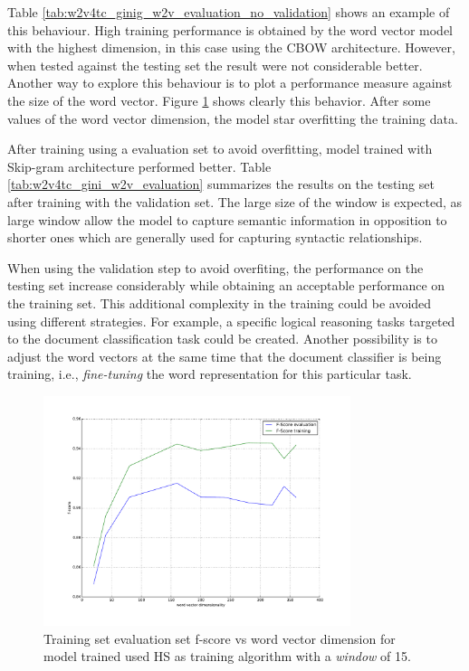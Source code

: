Table \ref{tab:w2v4tc_ginig_w2v_evaluation_no_validation} shows an example
of this behaviour. High training performance is obtained by the word vector
model with the highest dimension, in this case using the \ac{CBOW} architecture.
However, when tested against the testing set the result were not considerable
better. Another way to explore this behaviour is to plot a performance
measure against the size of the word vector. Figure
\ref{fig:fscore-vs-size-dmr} shows clearly this behavior. After some values
of the word vector dimension, the model star overfitting  the training data. 

After training using a evaluation set to avoid overfitting,  model trained
with Skip-gram architecture performed better. Table
\ref{tab:w2v4tc_gini_w2v_evaluation} summarizes the results on the testing
set after training with the validation set. The large size of the window is
expected, as large window allow the model to capture semantic information in
opposition to shorter ones which are generally used for capturing syntactic relationships.

When using the validation step to avoid overfiting, the performance on the
testing set increase considerably while obtaining an acceptable performance
on the training set. This additional complexity in the training could be
avoided using different strategies. For example, a specific logical reasoning tasks
targeted to the document classification task could be created. Another possibility is to
adjust the word vectors at the same time that the document classifier is
being training, i.e.,  \textit{fine-tuning} the word representation for this
particular task.


\begin{figure}[!h]
    \centering
    \includegraphics[width=0.80\textwidth]{images/005-fscore-vs-training-size.pdf}
    \caption{Training set  evaluation set f-score vs word vector dimension
      for model trained used \ac{HS} as training algorithm with a \textit{window} of 15.}
    \label{fig:fscore-vs-size-dmr}
\end{figure}



